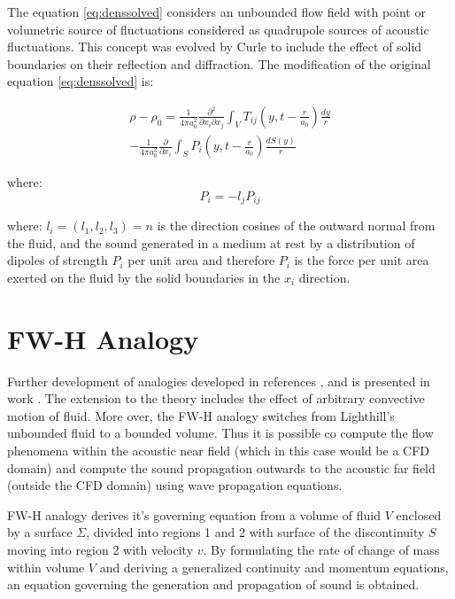 The equation \ref{eq:denssolved} considers an unbounded flow field with point or volumetric source of fluctuations considered as quadrupole sources of acoustic fluctuations. This concept was evolved by Curle \citep{curle} to include the effect of solid boundaries on their reflection and diffraction. The modification of the original equation \ref{eq:denssolved} is:

\begin{equation} \label{eq:denscurle}
\begin{split}
\rho - \rho_0 = \frac{1}{4 \pi a_0^2} \frac{\partial^2}{\partial x_i \partial x_j}
\int_V T_{ij} \left(y, t - \frac{r}{a_0} \right) \frac{dy}{r} \\
- \frac{1}{4 \pi a_0^2} \frac{\partial}{\partial x_i}
\int_S P_i \left(y, t - \frac{r}{a_0} \right) \frac{dS(y)}{r}
\end{split}
\end{equation}

\noindent where:
\begin{equation} \label{eq:curlePi}
P_i = -l_j P_{ij}
\end{equation}

\noindent where: $l_i = (l_1, l_2, l_3) = n$ is the direction cosines of the outward normal from the fluid, and the sound generated in a medium at rest by a distribution of dipoles of strength $P_i$ per unit area and therefore $P_i$ is the force per unit area exerted on the fluid by the solid boundaries in the $x_i$ direction.



\section{FW-H Analogy}
Further development of analogies developed in references \citep{Light1}, \citep{Light2} and \citep{curle} is presented in work \citep{FWH}. The extension to the theory includes the effect of arbitrary convective motion of fluid. More over, the FW-H analogy switches from Lighthill's unbounded fluid to a bounded volume. Thus it is possible co compute the flow phenomena within the acoustic near field (which in this case would be a CFD domain) and compute the sound propagation outwards to the acoustic far field (outside the CFD domain) using wave propagation equations.

FW-H analogy derives it's governing equation from a volume of fluid $V$ enclosed by a surface $\Sigma$, divided into regions 1 and 2 with surface of the discontinuity $S$ moving into region 2 with velocity $v$. By formulating the rate of change of mass within volume $V$ and deriving a generalized continuity and momentum equations, an equation governing the generation and propagation of sound is obtained.

